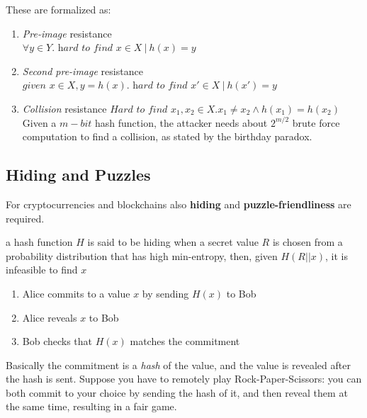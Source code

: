 These are formalized as:
\begin{enumerate}
   \item \textit{Pre-image} resistance\\
   $\forall y \in Y. \textit{ hard to find } x \in X\ |\ h(x) = y$
   \item \textit{Second pre-image} resistance
   $\textit{given } x \in X, y = h(x). \textit{ hard to find } x' \in X\ |\ h(x') = y$
   \item \textit{Collision} resistance
   $\textit{Hard to find } x_1,x_2 \in X. x_1 \neq x_2 \wedge h(x_1) = h(x_2)$
   Given a $m-bit$ hash function, the attacker needs about $2^{m/2}$ brute force computation to find a collision, as stated by the birthday paradox.
\end{enumerate}


\subsection{Hiding and Puzzles}
For cryptocurrencies and blockchains also \textbf{hiding} and \textbf{puzzle-friendliness} are required.
\begin{definition}[Hiding]
a hash function $H$ is said to be hiding when a secret value $R$ is chosen from
a probability distribution that has high min-entropy, then, given  $H(R || x)$, it is infeasible to find $x$
\end{definition}
\nl

 {
   \begin{enumerate}
      \item Alice commits to a value $x$ by sending $H(x)$ to Bob
      \item Alice reveals $x$ to Bob
      \item Bob checks that $H(x)$ matches the commitment
   \end{enumerate}
   Basically the commitment is a \textit{hash} of the value, and the value is revealed after the hash is sent.
   Suppose you have to remotely play Rock-Paper-Scissors: you can both commit to your choice by sending the hash of it, and then reveal them at the same time, resulting in a fair game. 
}

